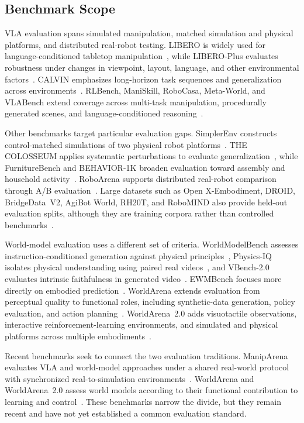 \documentclass{ieeeaccess}
\begin{document}
\subsection{Benchmark Scope}

VLA evaluation spans simulated manipulation, matched simulation and physical platforms, and distributed real-robot testing. LIBERO is widely used for language-conditioned tabletop manipulation~\cite{liu2023libero}, while LIBERO-Plus evaluates robustness under changes in viewpoint, layout, language, and other environmental factors~\cite{liberoplus}. CALVIN emphasizes long-horizon task sequences and generalization across environments~\cite{calvin}. RLBench, ManiSkill, RoboCasa, Meta-World, and VLABench extend coverage across multi-task manipulation, procedurally generated scenes, and language-conditioned reasoning~\cite{rlbench,maniskill3,robocasa,metaworld,vlabench}.

Other benchmarks target particular evaluation gaps. SimplerEnv constructs control-matched simulations of two physical robot platforms~\cite{simplerenv}. THE COLOSSEUM applies systematic perturbations to evaluate generalization~\cite{colosseum}, while FurnitureBench and BEHAVIOR-1K broaden evaluation toward assembly and household activity~\cite{furniturebench,behavior1k}. RoboArena supports distributed real-robot comparison through A/B evaluation~\cite{roboarena}. Large datasets such as Open X-Embodiment, DROID, BridgeData~V2, AgiBot World, RH20T, and RoboMIND also provide held-out evaluation splits, although they are training corpora rather than controlled benchmarks~\cite{oxe,droid,bridgedata,agibotworld,rh20t,robomind}.

World-model evaluation uses a different set of criteria. WorldModelBench assesses instruction-conditioned generation against physical principles~\cite{wmbench}, Physics-IQ isolates physical understanding using paired real videos~\cite{physicsiq}, and VBench-2.0 evaluates intrinsic faithfulness in generated video~\cite{vbench2}. EWMBench focuses more directly on embodied prediction~\cite{genieenvisioner}. WorldArena extends evaluation from perceptual quality to functional roles, including synthetic-data generation, policy evaluation, and action planning~\cite{worldarena}. WorldArena~2.0 adds visuotactile observations, interactive reinforcement-learning environments, and simulated and physical platforms across multiple embodiments~\cite{shang2026worldarena2}.

\textcolor[RGB]{104,48,148}{Recent benchmarks seek to connect the two evaluation traditions.} ManipArena evaluates VLA and world-model approaches under a shared real-world protocol with synchronized real-to-simulation environments~\cite{maniparena}. WorldArena and WorldArena~2.0 assess world models according to their functional contribution to learning and control~\cite{worldarena,shang2026worldarena2}. These benchmarks narrow the divide, but they remain recent and have not yet established a common evaluation standard.
\end{document}
